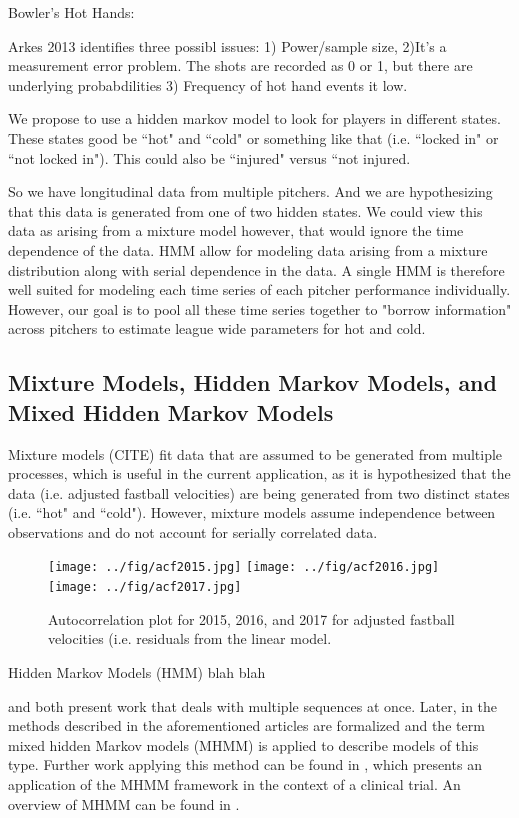 \documentclass[letterpaper,12pt]{article}\usepackage[]{graphicx}\usepackage[]{color}
\begin{document}
Bowler's Hot Hands: 



Arkes 2013 identifies three possibl issues: 1) Power/sample size, 2)It's a measurement error problem.  The shots are recorded as 0 or 1, but there are underlying probabdilities 3) Frequency of hot hand events it low.  

We propose to use a hidden markov model to look for players in different states.  These states good be ``hot" and ``cold" or something like that (i.e. ``locked in" or ``not locked in").  This could also be ``injured" versus ``not injured. 

So we have longitudinal data from multiple pitchers.  And we are hypothesizing that this data is generated from one of two hidden states.  We could view this data as arising from a mixture model however, that would ignore the time dependence of the data.  HMM allow for modeling data arising from a mixture distribution along with serial dependence in the data.  A single HMM is therefore well suited for modeling each time series of each pitcher performance individually.  However, our goal is to pool all these time series together to "borrow information" across pitchers to estimate league wide parameters for hot and cold.  

\subsection{Mixture Models, Hidden Markov Models, and Mixed Hidden Markov Models}
Mixture models (CITE) fit data that are assumed to be generated from multiple processes, which is useful in the current application, as it is hypothesized that the data (i.e. adjusted fastball velocities) are being generated from two distinct states (i.e. ``hot" and ``cold").  However, mixture models assume independence between observations and do not account for serially correlated data.  

\begin{figure}[ht]
		\texttt{[image: ../fig/acf2015.jpg]}
		\texttt{[image: ../fig/acf2016.jpg]}
	\texttt{[image: ../fig/acf2017.jpg]}

	  \caption{Autocorrelation plot for 2015, 2016, and 2017 for adjusted fastball velocities (i.e. residuals from the linear model.}
  \label{acf}
\end{figure}

Hidden Markov Models (HMM) blah blah



\cite{Humphreys1998} and \cite{Seltman2002} both present work that deals with multiple sequences at once.  Later, in \cite{Altman2007} the methods described in the aforementioned articles are formalized and the term mixed hidden Markov models (MHMM) is applied to describe models of this type.   Further work applying this method can be found in \cite{ShirleyEtAl2010}, which presents an application of the MHMM framework in the context of a clinical trial.  An overview of MHMM can be found in \cite{Maruotti2011}.  
\end{document}
